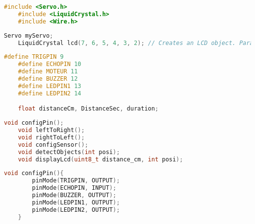 
\begin{lstlisting}[language=cpp,caption={Insert Library}]
    #include <Servo.h>
    #include <LiquidCrystal.h>
    #include <Wire.h>
\end{lstlisting}

\begin{lstlisting}[language=cpp,caption={Create Variable and LCD object}]
    Servo myServo;
    LiquidCrystal lcd(7, 6, 5, 4, 3, 2); // Creates an LCD object. Parameters: (rs, enable, d4, d5, d6, d7)
\end{lstlisting}

\begin{lstlisting}[language=cpp,caption={Define the Variables with the Value of PIN}]
    #define TRIGPIN 9
    #define ECHOPIN 10
    #define MOTEUR 11
    #define BUZZER 12
    #define LEDPIN1 13
    #define LEDPIN2 14

    float distanceCm, DistanceSec, duration;
\end{lstlisting}

\begin{lstlisting}[language=cpp,caption={Call the Funtions}]
    void configPin();
    void leftToRight();
    void rightToLeft();
    void configSensor();
    void detectObjects(int posi);
    void displayLcd(uint8_t distance_cm, int posi);
\end{lstlisting}

\begin{lstlisting}[language=cpp,caption={Define "configPin()" Function}]
    void configPin(){
        pinMode(TRIGPIN, OUTPUT);
        pinMode(ECHOPIN, INPUT);
        pinMode(BUZZER, OUTPUT);
        pinMode(LEDPIN1, OUTPUT);
        pinMode(LEDPIN2, OUTPUT);
    }
\end{lstlisting}

